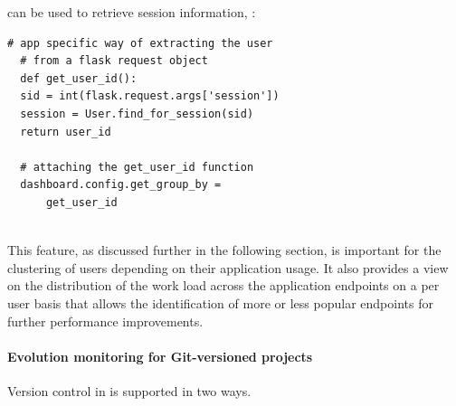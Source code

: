 \documentclass{sig-alternate-05-2015}
\begin{document}
   can be used to retrieve session information, : 
  
  \begin{lstlisting}[style=custompython]  
  # app specific way of extracting the user
  # from a flask request object    
  def get_user_id():
  sid = int(flask.request.args['session'])
  session = User.find_for_session(sid)
  return user_id
  
  # attaching the get_user_id function
  dashboard.config.get_group_by = 
      get_user_id
  
  \end{lstlisting}
  This feature, as discussed further in the following section, is important for the clustering of users depending on their application usage. It also provides a view on the distribution of the work load across the application endpoints on a per user basis that allows the identification of more or less popular endpoints for further performance improvements. 
  
  \paragraph{Evolution monitoring for Git-versioned projects }
  
  Version control in \tool is supported in two ways. 
\end{document}
